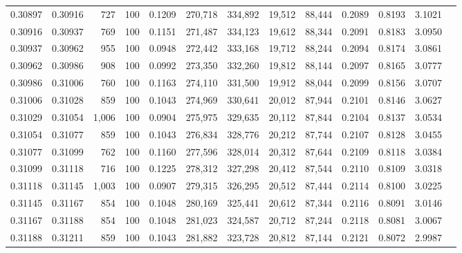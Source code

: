 \begin{tabular}{rrrrrrrrrrrrr}
0.30897 & 0.30916 &   727 & 100 &                                     0.1209 & 270,718 & 334,892 &  19,512 &  88,444 & 0.2089 & 0.8193 & 3.1021 \\
0.30916 & 0.30937 &   769 & 100 &                                     0.1151 & 271,487 & 334,123 &  19,612 &  88,344 & 0.2091 & 0.8183 & 3.0950 \\
0.30937 & 0.30962 &   955 & 100 &                                     0.0948 & 272,442 & 333,168 &  19,712 &  88,244 & 0.2094 & 0.8174 & 3.0861 \\
0.30962 & 0.30986 &   908 & 100 &                                     0.0992 & 273,350 & 332,260 &  19,812 &  88,144 & 0.2097 & 0.8165 & 3.0777 \\
0.30986 & 0.31006 &   760 & 100 &                                     0.1163 & 274,110 & 331,500 &  19,912 &  88,044 & 0.2099 & 0.8156 & 3.0707 \\
0.31006 & 0.31028 &   859 & 100 &                                     0.1043 & 274,969 & 330,641 &  20,012 &  87,944 & 0.2101 & 0.8146 & 3.0627 \\
0.31029 & 0.31054 & 1,006 & 100 &                                     0.0904 & 275,975 & 329,635 &  20,112 &  87,844 & 0.2104 & 0.8137 & 3.0534 \\
0.31054 & 0.31077 &   859 & 100 &                                     0.1043 & 276,834 & 328,776 &  20,212 &  87,744 & 0.2107 & 0.8128 & 3.0455 \\
0.31077 & 0.31099 &   762 & 100 &                                     0.1160 & 277,596 & 328,014 &  20,312 &  87,644 & 0.2109 & 0.8118 & 3.0384 \\
0.31099 & 0.31118 &   716 & 100 &                                     0.1225 & 278,312 & 327,298 &  20,412 &  87,544 & 0.2110 & 0.8109 & 3.0318 \\
0.31118 & 0.31145 & 1,003 & 100 &                                     0.0907 & 279,315 & 326,295 &  20,512 &  87,444 & 0.2114 & 0.8100 & 3.0225 \\
0.31145 & 0.31167 &   854 & 100 &                                     0.1048 & 280,169 & 325,441 &  20,612 &  87,344 & 0.2116 & 0.8091 & 3.0146 \\
0.31167 & 0.31188 &   854 & 100 &                                     0.1048 & 281,023 & 324,587 &  20,712 &  87,244 & 0.2118 & 0.8081 & 3.0067 \\
0.31188 & 0.31211 &   859 & 100 &                                     0.1043 & 281,882 & 323,728 &  20,812 &  87,144 & 0.2121 & 0.8072 & 2.9987 \\

\end{tabular}
